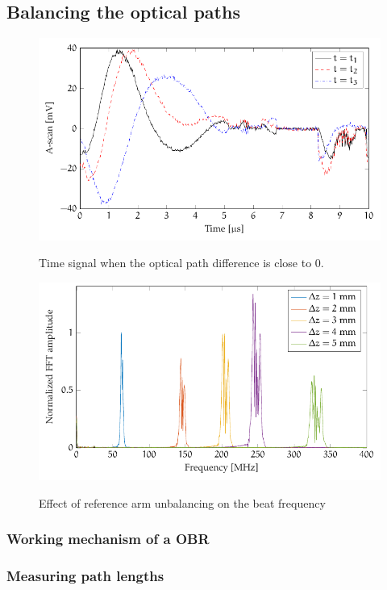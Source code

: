 \subsection{Balancing the optical paths}

\begin{figure}[hbt]
{\myfloatalign
\includegraphics[width=\linewidth]{gfx/tikz/balancing/balanced}}
\caption{Time signal when the optical path difference is close to 0.}\label{fig:signal-balanced}
\end{figure}

\begin{figure}[hbt]
{\myfloatalign
\includegraphics[width=\linewidth]{gfx/tikz/balancing/unbalanced}}
\caption{Effect of reference arm unbalancing on the beat frequency}\label{fig:unbalanced-spectrum}
\end{figure}
\subsubsection{Working mechanism of a OBR}

\subsubsection{Measuring path lengths}



